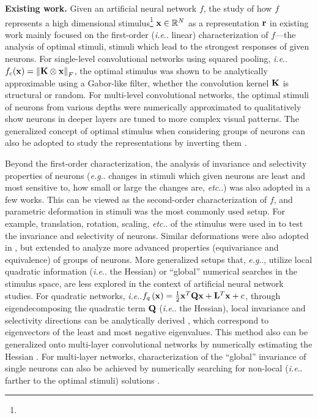 \documentclass[fleqn]{article} %
\makeatletter
\DeclareRobustCommand\onedot{\futurelet\@let@token\@onedot}
\def\@onedot{\ifx\@let@token.\else.\null\fi\xspace}
\def\eg{\emph{e.g}\onedot} \def\Eg{\emph{E.g}\onedot}
\def\ie{\emph{i.e}\onedot} \def\Ie{\emph{I.e}\onedot}
\def\etc{\emph{etc}\onedot} \def\vs{\emph{vs}\onedot}
\makeatother
\begin{document}
{\bf Existing work.} 
Given an artificial neural network $f$, the study of how $f$ represents a high dimensional stimulus\footnote{\expstimdim} ${\bf{x}} \in \mathbb{R}^N$ as a representation 
${\bf{r}}$ in existing work mainly focused on the first-order (\ie linear) characterization of $f$---the analysis of optimal stimuli, stimuli which lead to the strongest responses of given neurons.
For single-level convolutional networks using squared pooling, \ie $f_c({\bf{x}}) = \left\| {\bf{K}} \otimes {\bf{x}} \right\|_{F}$, the optimal stimulus was shown to be analytically approximable \cite{saxe2011random} using a Gabor-like filter, whether the convolution kernel $\bf{K}$ is structural or random.
For multi-level convolutional networks, the optimal stimuli of neurons from various depths were numerically approximated \cite{erhan2010understanding, ngiam2010tiled, le2012building, zeiler2014visualizing, simonyan2013deep} to qualitatively show neurons in deeper layers are tuned to more complex visual patterns.
The generalized concept of optimal stimulus when considering groups of neurons can also be adopted to study the representations by inverting them \cite{mahendran2014understanding}.

Beyond the first-order characterization, the analysis of invariance and selectivity properties of neurons (\eg changes in stimuli which given neurons are least and most sensitive to, how small or large the changes are, \etc) was also adopted in a few works.
This can be viewed as the second-order characterization of $f$, and parametric deformation in stimuli was the most commonly used setup.
For example, translation, rotation, scaling, \etc of the stimulus were used in \cite{goodfellow2009measuring, zeiler2014visualizing} to test the invariance and selectivity of neurons.
Similar deformations were also adopted in \cite{lenc2014understanding}, but extended to analyze more advanced properties (equivariance and equivalence) of groups of neurons.
More generalized setups that, \eg, utilize local quadratic information (\ie the Hessian) or ``global'' numerical searches in the stimulus space, are less explored in the context of artificial neural network studies. %
For quadratic networks, \ie $f_q\left({\bf{x}}\right) = \frac{1}{2}{\bf{x}}^{T}{\bf{Qx}}+{\bf{L}}^{T}{\bf{x}}+c$, through eigendecomposing the quadratic term $\bf{Q}$ (\ie the Hessian), local invariance and selectivity directions can be analytically derived \cite{berkes2006analysis}, which correspond to eigenvectors of the least and most negative eigenvalues.
This method also can be generalized onto multi-layer convolutional networks by numerically estimating the Hessian \cite{ngiam2010tiled}.
For multi-layer networks, characterization of the ``global'' invariance of single neurons can also be achieved by numerically searching for non-local (\ie farther to the optimal stimuli) solutions \cite{erhan2010understanding}.
\end{document}
